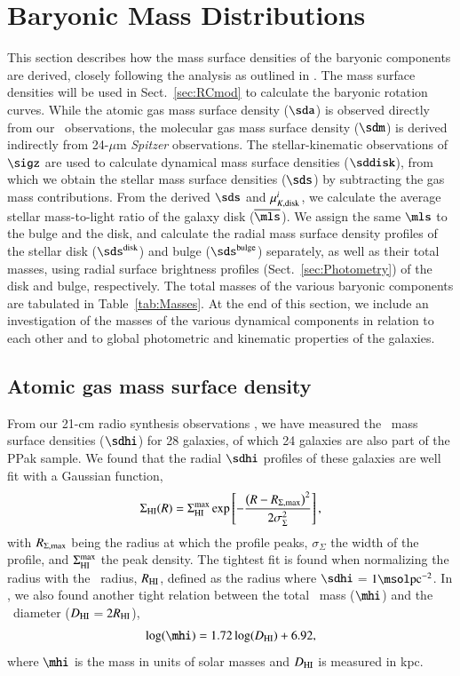 \documentclass[traditabstract]{aa} %
\begin{document}
\section{Baryonic Mass Distributions}
\label{sec:Sigma}
This section describes how the mass surface densities of the baryonic components are 
derived, closely following the analysis as outlined in .
The mass surface densities will be used in Sect.~\ref{sec:RCmod} to calculate the baryonic 
rotation curves. While the atomic gas mass surface density ($\sda$) is observed directly
from our \hone\ observations, the molecular gas mass surface density ($\sdm$)
is derived indirectly from 24-$\mu$m {\it Spitzer} observations. The stellar-kinematic 
observations of $\sigz$ are used to calculate dynamical mass surface densities ($\sddisk$),
from which we obtain the stellar mass surface densities ($\sds$) by subtracting the gas
mass contributions.
%
From the derived $\sds$ and $\mu_{K,\rm disk}^{i}$, we calculate the average stellar
mass-to-light ratio of the galaxy disk ($\overline{\mls}$). We assign the same $\mls$ to
the bulge and the disk, and calculate the radial mass surface density profiles of the
stellar disk ($\sds^{\rm disk}$) and bulge ($\sds^{\rm bulge}$) separately, as well as
their total masses, using radial surface brightness profiles (Sect.~\ref{sec:Photometry})
of the disk and bulge, respectively. The total masses of the various baryonic components
are tabulated in Table~\ref{tab:Masses}.
%
At the end of this section, we include an investigation of the masses of the various 
dynamical components in relation to each other and to global photometric and kinematic
properties of the galaxies.


\subsection{Atomic gas mass surface density}
\label{sec:SigmaHImod}
From our 21-cm radio synthesis observations
\citep[Sect.~\ref{sec:HIdata};][]{martinsson2011}, we have measured the \hone\ mass
surface densities ($\sdhi$) for 28 galaxies, of which 24 galaxies are also part of the
PPak sample. We found that the radial $\sdhi$ profiles of these galaxies are well fit with
a Gaussian function,
%
\begin{equation}
%
\Sigma_{\rm HI}(R) = \Sigma_{\rm HI}^{\rm max}
\exp \left[-\frac{\left(R-R_{\rm \Sigma,max}\right)^2}{2\sigma_{\Sigma}^2}\right] ,
%
\label{eq:Sigma_HI}
%
\end{equation}
%
with $R_{\rm \Sigma,max}$ being the radius at which the profile peaks, $\sigma_{\Sigma}$ 
the width of the profile, and $\Sigma_{\rm HI}^{\rm max}$ the peak density. The tightest 
fit is found when normalizing the radius with the \hone\ radius, $R_{\rm HI}$, defined as 
the radius where $\sdhi$$=$$1\msol \rm pc^{-2}$.
In \cite{martinsson2011}, we also found another tight relation between the total 
\hone\ mass ($\mhi$) and the \hone\ diameter ($D_{\rm HI}$$=$$2 R_{\rm HI}$), 
%
\begin{equation}
%
\log(\mhi) = 1.72 \log(D_{\rm HI}) + 6.92,
%
\label{eq:MHIDHI}
%
\end{equation}
%
where $\mhi$ is the mass in units of solar masses and $D_{\rm HI}$ is measured in kpc.
\end{document}
